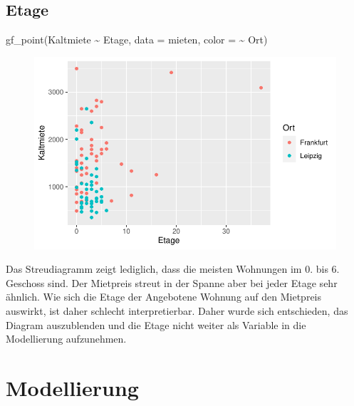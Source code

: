 \documentclass[
  a4paper,
  DIV=11]{scrartcl}
\newenvironment{Shaded}{\begin{snugshade}}{\end{snugshade}}
\newcommand{\AttributeTok}[1]{\textcolor[rgb]{0.40,0.45,0.13}{#1}}
\newcommand{\FunctionTok}[1]{\textcolor[rgb]{0.28,0.35,0.67}{#1}}
\newcommand{\NormalTok}[1]{\textcolor[rgb]{0.00,0.23,0.31}{#1}}
\newcommand{\SpecialCharTok}[1]{\textcolor[rgb]{0.37,0.37,0.37}{#1}}
\begin{document}
\hypertarget{etage}{%
\subsection{Etage}\label{etage}}

\begin{Shaded}
\begin{Highlighting}[]
\FunctionTok{gf\_point}\NormalTok{(Kaltmiete }\SpecialCharTok{\textasciitilde{}}\NormalTok{ Etage, }\AttributeTok{data =}\NormalTok{ mieten, }\AttributeTok{color =} \SpecialCharTok{\textasciitilde{}}\NormalTok{ Ort)}
\end{Highlighting}
\end{Shaded}

\begin{figure}[H]

{\centering \includegraphics{Mietmodellierung_files/figure-pdf/unnamed-chunk-15-1.pdf}

}

\end{figure}

Das Streudiagramm zeigt lediglich, dass die meisten Wohnungen im 0. bis
6. Geschoss sind. Der Mietpreis streut in der Spanne aber bei jeder
Etage sehr ähnlich. Wie sich die Etage der Angebotene Wohnung auf den
Mietpreis auswirkt, ist daher schlecht interpretierbar. Daher wurde sich
entschieden, das Diagram auszublenden und die Etage nicht weiter als
Variable in die Modellierung aufzunehmen.

\hypertarget{modellierung}{%
\section{Modellierung}\label{modellierung}}
\end{document}
